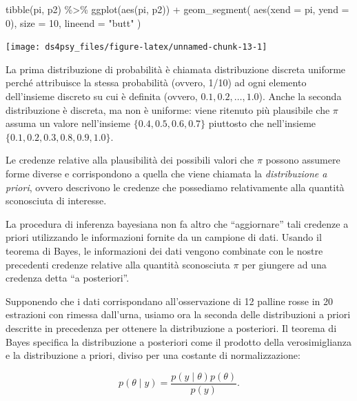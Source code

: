 \documentclass[
  11pt,
]{krantz}
\makeatletter
\newenvironment{Shaded}{\begin{snugshade}}{\end{snugshade}}
\newcommand{\AttributeTok}[1]{\textcolor[rgb]{0.61,0.61,0.61}{#1}}
\newcommand{\DecValTok}[1]{\textcolor[rgb]{0.06,0.06,0.06}{#1}}
\newcommand{\FunctionTok}[1]{\textcolor[rgb]{0,0,0}{#1}}
\newcommand{\NormalTok}[1]{#1}
\newcommand{\SpecialCharTok}[1]{\textcolor[rgb]{0,0,0}{#1}}
\newcommand{\StringTok}[1]{\textcolor[rgb]{0.5,0.5,0.5}{#1}}
\newenvironment{kframe}{%
\medskip{}
\setlength{\fboxsep}{.8em}
 \def\at@end@of@kframe{}%
 \ifinner\ifhmode%
  \def\at@end@of@kframe{\end{minipage}}%
  \begin{minipage}{\columnwidth}%
 \fi\fi%
 \def\FrameCommand##1{\hskip\@totalleftmargin \hskip-\fboxsep
 \colorbox{shadecolor}{##1}\hskip-\fboxsep
     \hskip-\linewidth \hskip-\@totalleftmargin \hskip\columnwidth}%
 \MakeFramed {\advance\hsize-\width
   \@totalleftmargin\z@ \linewidth\hsize
   \@setminipage}}%
 {\par\unskip\endMakeFramed%
 \at@end@of@kframe}
\renewenvironment{Shaded}{\begin{kframe}}{\end{kframe}}
\theoremstyle{definition}
\theoremstyle{definition}
\theoremstyle{definition}
\theoremstyle{definition}
\theoremstyle{remark}
\makeatother
\begin{document}
\begin{Shaded}
\begin{Highlighting}[]
\FunctionTok{tibble}\NormalTok{(pi, p2) }\SpecialCharTok{\%\textgreater{}\%}
  \FunctionTok{ggplot}\NormalTok{(}\FunctionTok{aes}\NormalTok{(pi, p2)) }\SpecialCharTok{+}
  \FunctionTok{geom\_segment}\NormalTok{(}
    \FunctionTok{aes}\NormalTok{(}\AttributeTok{xend =}\NormalTok{ pi, }\AttributeTok{yend =} \DecValTok{0}\NormalTok{),}
    \AttributeTok{size =} \DecValTok{10}\NormalTok{, }\AttributeTok{lineend =} \StringTok{"butt"}
\NormalTok{  )}
\end{Highlighting}
\end{Shaded}

\begin{center}\texttt{[image: ds4psy\_files/figure-latex/unnamed-chunk-13-1]} \end{center}

La prima distribuzione di probabilità è chiamata distribuzione discreta uniforme perché attribuisce la stessa probabilità (ovvero, 1/10) ad ogni elemento dell'insieme discreto su cui è definita (ovvero, \(0.1, 0.2, \dots, 1.0\)). Anche la seconda distribuzione è discreta, ma non è uniforme: viene ritenuto più plausibile che \(\pi\) assuma un valore nell'insieme \(\{0.4, 0.5, 0.6, 0.7\}\) piuttosto che nell'insieme \(\{0.1, 0.2, 0.3, 0.8, 0.9, 1.0\}\).

Le credenze relative alla plausibilità dei possibili valori che \(\pi\) possono assumere forme diverse e corrispondono a quella che viene chiamata la \emph{distribuzione a priori}, ovvero descrivono le credenze che possediamo relativamente alla quantità sconosciuta di interesse.

La procedura di inferenza bayesiana non fa altro che ``aggiornare'' tali credenze a priori utilizzando le informazioni fornite da un campione di dati. Usando il teorema di Bayes, le informazioni dei dati vengono combinate con le nostre precedenti credenze relative alla quantità sconosciuta \(\pi\) per giungere ad una credenza detta ``a posteriori''.

Supponendo che i dati corrispondano all'osservazione di 12 palline rosse in 20 estrazioni con rimessa dall'urna, usiamo ora la seconda delle distribuzioni a priori descritte in precedenza per ottenere la distribuzione a posteriori. Il teorema di Bayes specifica la distribuzione a posteriori come il prodotto della verosimiglianza e la distribuzione a priori, diviso per una costante di normalizzazione:

\[
p(\theta \mid y) = \frac{p(y \mid \theta)p(\theta)}{p(y)}.
\]
\end{document}
